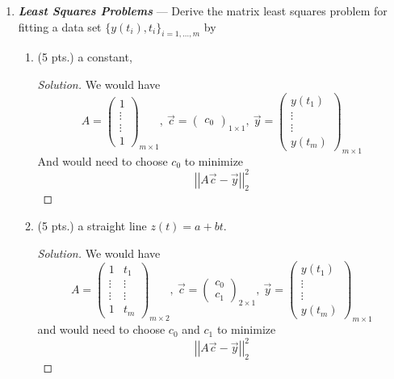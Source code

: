 \documentclass[12pt]{article}
\newcommand{\gnorm}[1]{\left|\left|#1\right|\right|}
\newcommand{\parens}[1]{\left(#1\right)}
\newcommand{\bfit}[1]{\textbf{\textit{#1}}}
\begin{document}
\begin{enumerate}
 \item \bfit{Least Squares Problems} --- Derive the matrix least squares
   problem for fitting a data set $\{y(t_i),t_i\}_{i=1,\dots,m}$ by
   \begin{enumerate}
   \item (5 pts.) a constant,
   \begin{proof}[Solution]
   We would have
   $$A = \parens{\begin{matrix}
   1\\
   \vdots\\
   \vdots\\
   1
   \end{matrix}}_{m\times 1},\ \vec{c} = \parens{
   \begin{matrix}
   c_0
   \end{matrix}
   }_{1\times 1},\ \vec{y} = \parens{
   \begin{matrix}
   y(t_1)\\
   \vdots\\
   \vdots\\
   y(t_m)
   \end{matrix}
   }_{m\times 1}
   $$
   And would need to choose $c_0$ to minimize 
   $$\gnorm{A\vec{c} - \vec{y}}_2^2$$
   \end{proof}

     
     
   \item (5 pts.) a straight line $z(t)=a+bt$.
	\begin{proof}[Solution]
   We would have
   $$A = \parens{\begin{matrix}
   1 & t_1\\
   \vdots & \vdots \\
   \vdots & \vdots \\
   1 & t_m
   \end{matrix}}_{m\times 2},\ \vec{c} = \parens{
   \begin{matrix}
   c_0 \\
   c_1
   \end{matrix}
   }_{2\times 1},\ \vec{y} = \parens{
   \begin{matrix}
   y(t_1)\\
   \vdots\\
   \vdots\\
   y(t_m)
   \end{matrix}
   }_{m\times 1}
   $$
   and would need to choose $c_0$ and $c_1$ to minimize 
   $$\gnorm{A\vec{c} - \vec{y}}_2^2$$
   \end{proof}
     

\end{enumerate}
\end{enumerate}
\end{document}
